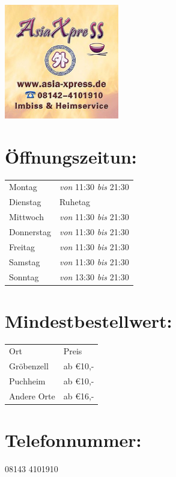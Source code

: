 \documentclass[12pt,nofoldmark,notumble]{leaflet}
\begin{document}


\begin{center}
  \includegraphics[height=5cm,keepaspectratio]{logo.png}%
\end{center}

\section{Öffnungszeitun:}
\begin{tabular}{lp{8.3cm}}
  Montag & \emph{von} 11:30 \emph{bis} 21:30 \\
  Dienstag & Ruhetag \\
  Mittwoch & \emph{von} 11:30 \emph{bis} 21:30 \\
  Donnerstag & \emph{von} 11:30 \emph{bis} 21:30 \\
  Freitag & \emph{von} 11:30 \emph{bis} 21:30 \\
  Samstag & \emph{von} 11:30 \emph{bis} 21:30 \\
  Sonntag & \emph{von} 13:30 \emph{bis} 21:30
\end{tabular}

\section{Mindestbestellwert:}
\begin{tabular}{lp{8.3cm}}
  Ort & Preis \\
  Gröbenzell & ab €10,- \\
  Puchheim & ab €10,- \\
  Andere Orte & ab €16,-
\end{tabular}

\section{Telefonnummer:}
08143 4101910
\end{document}
